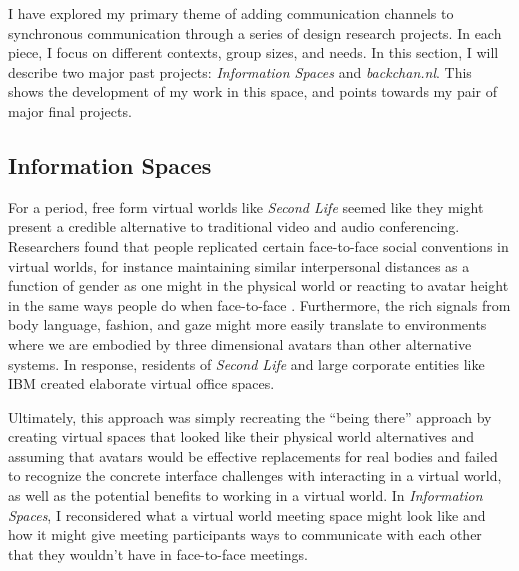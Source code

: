 \documentclass{tufte-handout}
\begin{document}
I have explored my primary theme of adding communication channels to synchronous communication through a series of design research projects. In each piece, I focus on different contexts, group sizes, and needs. In this section, I will describe two major past projects: \emph{Information Spaces} and \emph{backchan.nl}. This shows the development of my work in this space, and points towards my pair of major final projects.


\subsection{Information Spaces}


For a period, free form virtual worlds  like \emph{Second Life} seemed like they might present a credible alternative to traditional video and audio conferencing. Researchers found that people replicated certain face-to-face social conventions in virtual worlds, for instance maintaining similar interpersonal distances as a function of gender as one might in the physical world \citet{yee_interpersonal_distance} or reacting to avatar height in the same ways people do when face-to-face \citet{balison_height_or_whatever}. Furthermore, the rich signals from body language, fashion, and gaze might more easily translate to environments where we are embodied by three dimensional avatars than other alternative systems. In response, residents of \emph{Second Life} and large corporate entities like IBM \citet{something_about_ibm_in_sl} created elaborate virtual office spaces.

Ultimately, this approach was simply recreating the ``being there'' approach by creating virtual spaces that looked like their physical world alternatives and assuming that avatars would be effective replacements for real bodies and failed to recognize the concrete interface challenges with interacting in a virtual world, as well as the potential benefits to working in a virtual world. In \emph{Information Spaces}, I reconsidered what a virtual world meeting space might look like and how it might give meeting participants ways to communicate with each other that they wouldn't have in face-to-face meetings. \citet{CHI_infospace_paper}
\end{document}
